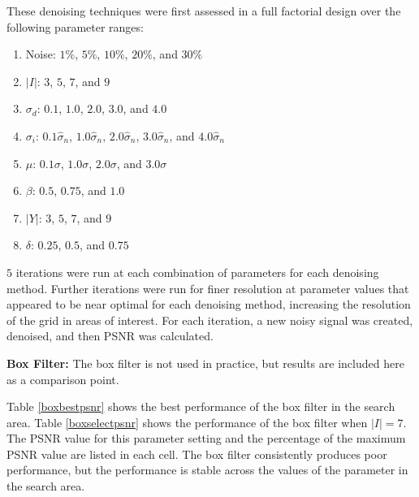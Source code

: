 \documentclass[11pt]{article}
\newcommand{\vs}{\vspace{0.1in}}
\theoremstyle{definition}
\begin{document}
These denoising techniques were first assessed in a full factorial design over the following parameter ranges:

\begin{enumerate}

\item Noise: $1$\%, $5$\%, $10$\%, $20$\%, and $30$\%

\item $\lvert I \rvert$: $3$, $5$, $7$, and $9$

\item $\sigma_d$: $0.1$, $1.0$, $2.0$, $3.0$, and $4.0$

\item $\sigma_i$: $0.1 \hat{\sigma}_n$, $1.0 \hat{\sigma}_n$, $2.0 \hat{\sigma}_n$, $3.0 \hat{\sigma}_n$, and $4.0 \hat{\sigma}_n$

\item $\mu$: $0.1 \sigma$, $1.0 \sigma$, $2.0 \sigma$, and $3.0 \sigma$

\item $\beta$: $0.5$, $0.75$, and $1.0$

\item $\lvert Y \rvert$: $3$, $5$, $7$, and $9$

\item $\delta$: $0.25$, $0.5$, and $0.75$

\end{enumerate}

$5$ iterations were run at each combination of parameters for each denoising method. Further iterations were run for finer resolution at parameter values that appeared to be near optimal for each denoising method, increasing the resolution of the grid in areas of interest. For each iteration, a new noisy signal was created, denoised, and then PSNR was calculated.

\vs
\noindent
\textbf{Box Filter:} The box filter is not used in practice, but results are included here as a comparison point.

Table \ref{boxbestpsnr} shows the best performance of the box filter in the search area. Table \ref{boxselectpsnr} shows the performance of the box filter when $\lvert I \rvert = 7$. The PSNR value for this parameter setting and the percentage of the maximum PSNR value are listed in each cell. The box filter consistently produces poor performance, but the performance is stable across the values of the parameter in the search area.
\end{document}
